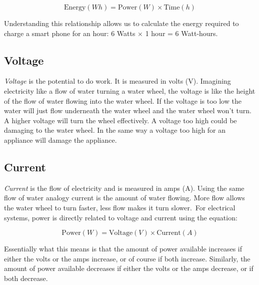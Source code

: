 \documentclass{article}
\theoremstyle{definition}
\theoremstyle{definition}
\theoremstyle{remark}
\begin{document}
    \begin{equation}
      \text{Energy} (Wh) = \text{Power} (W) \times \text{Time} (h)
    \end{equation}
    
    Understanding this relationship allows us to calculate the energy required to charge a smart phone for an hour: 6 Watts \(\times\) 1 hour = 6 Watt-hours.
  

  \subsection{Voltage} %
  \label{sub:voltage}

    \textit{Voltage} is the potential to do work. It is measured in volts (V). Imagining electricity like a flow of water turning a water wheel, the voltage is like the height of the flow of water flowing into the water wheel. If the voltage is too low the water will just flow underneath the water wheel and the water wheel won't turn. A higher voltage will turn the wheel effectively. A voltage too high could be damaging to the water wheel. In the same way a voltage too high for an appliance will damage the appliance.
  

  \subsection{Current} %
  \label{sub:current}

    \textit{Current} is the flow of electricity and is measured in amps (A). Using the same flow of water analogy current is the amount of water flowing. More flow allows the water wheel to turn faster, less flow makes it turn slower. For electrical systems, power is directly related to voltage and current using the equation:

    \begin{equation}
      \text{Power} (W) = \text{Voltage} (V) \times \text{Current} (A)
    \end{equation}

    Essentially what this means is that the amount of power available increases if either the volts or the amps increase, or of course if both increase. Similarly, the amount of power available decreases if either the volts or the amps decrease, or if both decrease.
  
\end{document}
